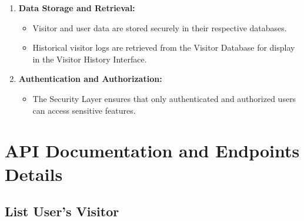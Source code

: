 \documentclass[a4 paper, 12pt]{article}
\begin{document}
\begin{enumerate}
            \item \textbf{Data Storage and Retrieval:}
                \begin{itemize}
                    \item Visitor and user data are stored securely in their respective databases.
                    \item Historical visitor logs are retrieved from the Visitor Database for display in the Visitor History Interface.
                \end{itemize}
            
            \item \textbf{Authentication and Authorization:}
                \begin{itemize}
                    \item The Security Layer ensures that only authenticated and authorized users can access sensitive features.
                \end{itemize}
\end{enumerate}
\section{API Documentation and Endpoints Details}

\subsection{List User's Visitor}
\end{document}
